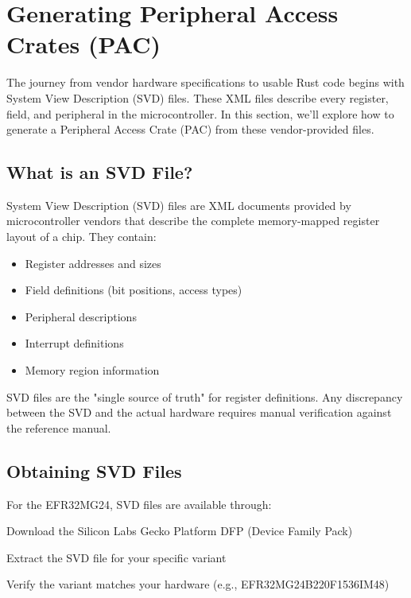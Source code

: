 
\section{Generating Peripheral Access Crates (PAC)}
\label{sec:pac-generation}

The journey from vendor hardware specifications to usable Rust code begins with System View Description (SVD) files. These XML files describe every register, field, and peripheral in the microcontroller. In this section, we'll explore how to generate a Peripheral Access Crate (PAC) from these vendor-provided files.

\subsection{What is an SVD File?}
\label{subsec:svd-file}

System View Description (SVD) files are XML documents provided by microcontroller vendors that describe the complete memory-mapped register layout of a chip. They contain:

\begin{itemize}
    \item Register addresses and sizes
    \item Field definitions (bit positions, access types)
    \item Peripheral descriptions
    \item Interrupt definitions
    \item Memory region information
\end{itemize}

\begin{notebox}
    SVD files are the "single source of truth" for register definitions. Any discrepancy between the SVD and the actual hardware requires manual verification against the reference manual.
\end{notebox}

\subsection{Obtaining SVD Files}
\label{subsec:obtaining-svd}

For the EFR32MG24, SVD files are available through:

\begin{enumeratex}
    \item Download the Silicon Labs Gecko Platform DFP (Device Family Pack)
    \item Extract the SVD file for your specific variant
    \item Verify the variant matches your hardware (e.g., EFR32MG24B220F1536IM48)
\end{enumeratex}

